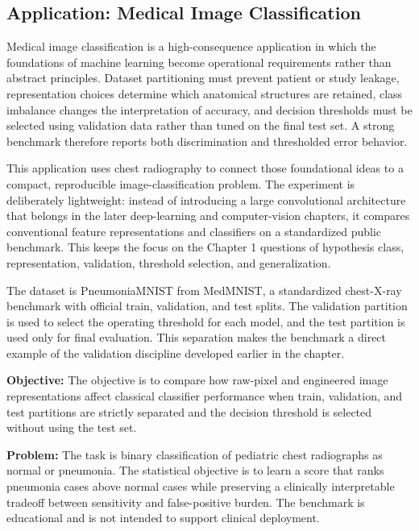 \subsection{Application: Medical Image Classification}

Medical image classification is a high-consequence application in which the foundations of machine learning become operational requirements rather than abstract principles. Dataset partitioning must prevent patient or study leakage, representation choices determine which anatomical structures are retained, class imbalance changes the interpretation of accuracy, and decision thresholds must be selected using validation data rather than tuned on the final test set. A strong benchmark therefore reports both discrimination and thresholded error behavior.

This application uses chest radiography to connect those foundational ideas to a compact, reproducible image-classification problem. The experiment is deliberately lightweight: instead of introducing a large convolutional architecture that belongs in the later deep-learning and computer-vision chapters, it compares conventional feature representations and classifiers on a standardized public benchmark. This keeps the focus on the Chapter 1 questions of hypothesis class, representation, validation, threshold selection, and generalization.

The dataset is PneumoniaMNIST from MedMNIST, a standardized chest-X-ray benchmark with official train, validation, and test splits. The validation partition is used to select the operating threshold for each model, and the test partition is used only for final evaluation. This separation makes the benchmark a direct example of the validation discipline developed earlier in the chapter.

\textbf{Objective:} The objective is to compare how raw-pixel and engineered image representations affect classical classifier performance when train, validation, and test partitions are strictly separated and the decision threshold is selected without using the test set.

\textbf{Problem:} The task is binary classification of pediatric chest radiographs as normal or pneumonia. The statistical objective is to learn a score that ranks pneumonia cases above normal cases while preserving a clinically interpretable tradeoff between sensitivity and false-positive burden. The benchmark is educational and is not intended to support clinical deployment.

